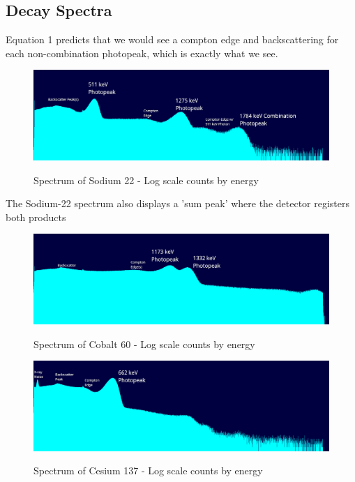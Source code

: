 \documentclass[11pt]{article} %
\begin{document}
    \subsection{Decay Spectra}
        Equation 1 predicts that we would see a compton edge and backscattering for each non-combination photopeak, which is exactly what we see.
        \begin{figure}[H] \centering \label{na22}
            \includegraphics[scale=0.3]{assets/na22_log_annotated.png}
            \caption{Spectrum of Sodium 22 - Log scale counts by energy}
        \end{figure}
        The Sodium-22 spectrum also displays a 'sum peak' where the detector registers both products
        \begin{figure}[H] \centering \label{co60}
            \includegraphics[scale=0.3]{assets/co60_log_annotated.png}
            \caption{Spectrum of Cobalt 60 - Log scale counts by energy}
        \end{figure}
        \begin{figure}[H] \centering \label{cs137}
            \includegraphics[scale=0.3]{assets/cs137_log_annotated.png}
            \caption{Spectrum of Cesium 137 - Log scale counts by energy}
        \end{figure}
\end{document}
